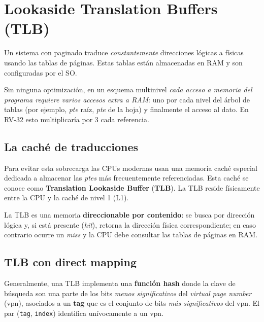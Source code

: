 \documentclass[11pt,a4paper]{article}
\begin{document}
\section{Lookaside Translation Buffers (TLB)}

Un sistema con paginado traduce \emph{constantemente} direcciones
lógicas a físicas usando las tablas de páginas. Estas tablas están
almacenadas en RAM y son configuradas por el SO.

\begin{importante}
Sin ninguna optimización, en un esquema multinivel \emph{cada acceso a
memoria del programa requiere varios accesos extra a RAM}: uno por cada
nivel del árbol de tablas (por ejemplo, \emph{pte} raíz, \emph{pte} de
la hoja) y finalmente el acceso al dato. En RV-32 esto multiplicaría
por 3 cada referencia.
\end{importante}

\subsection{La caché de traducciones}

Para evitar esta sobrecarga las CPUs modernas usan una memoria caché
especial dedicada a almacenar las \emph{ptes} más frecuentemente
referenciadas. Esta caché se conoce como
\textbf{Translation Lookaside Buffer} (\textbf{TLB}). La TLB reside
físicamente entre la CPU y la caché de nivel 1 (L1).

\begin{definicion}
La TLB es una memoria \textbf{direccionable por contenido}: se busca
por dirección lógica y, si está presente (\emph{hit}), retorna la
dirección física correspondiente; en caso contrario ocurre un
\emph{miss} y la CPU debe consultar las tablas de páginas en RAM.
\end{definicion}

\subsection{TLB con direct mapping}

Generalmente, una TLB implementa una \textbf{función hash} donde la
clave de búsqueda son una parte de los bits \emph{menos significativos}
del \emph{virtual page number} (vpn), asociados a un \textbf{tag} que
es el conjunto de bits \emph{más significativos} del vpn. El par
(\texttt{tag}, \texttt{index}) identifica unívocamente a un vpn.
\end{document}
